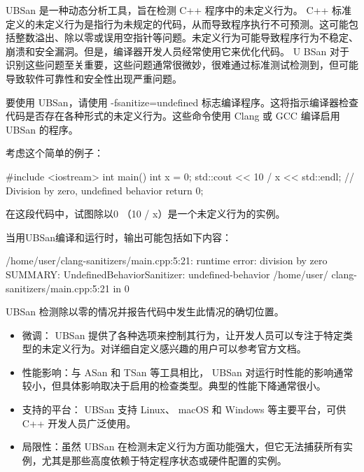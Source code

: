
UBSan 是一种动态分析工具，旨在检测 C++ 程序中的未定义行为。 C++ 标准定义的未定义行为是指行为未规定的代码，从而导致程序执行不可预测。这可能包括整数溢出、除以零或误用空指针等问题。未定义行为可能导致程序行为不稳定、崩溃和安全漏洞。但是，编译器开发人员经常使用它来优化代码。 U BSan 对于识别这些问题至关重要，这些问题通常很微妙，很难通过标准测试检测到，但可能导致软件可靠性和安全性出现严重问题。


要使用 UBSan，请使用 -fsanitize=undefined 标志编译程序。这将指示编译器检查代码是否存在各种形式的未定义行为。这些命令使用 Clang 或 GCC 编译启用 UBSan 的程序。


考虑这个简单的例子：

\begin{cpp}
#include <iostream>
int main() {
    int x = 0;
    std::cout << 10 / x << std::endl; // Division by zero, undefined behavior
    return 0;
}
\end{cpp}

在这段代码中，试图除以0 （10 / x）是一个未定义行为的实例。

当用UBSan编译和运行时，输出可能包括如下内容：

\begin{shell}
/home/user/clang-sanitizers/main.cpp:5:21: runtime error: division by
zero
SUMMARY: UndefinedBehaviorSanitizer: undefined-behavior /home/user/
clang-sanitizers/main.cpp:5:21 in
0
\end{shell}

UBSan 检测除以零的情况并报告代码中发生此情况的确切位置。


\begin{itemize}
\item
微调： UBSan 提供了各种选项来控制其行为，让开发人员可以专注于特定类型的未定义行为。对详细自定义感兴趣的用户可以参考官方文档。

\item
性能影响：与 ASan 和 TSan 等工具相比， UBSan 对运行时性能的影响通常较小，但具体影响取决于启用的检查类型。典型的性能下降通常很小。

\item
支持的平台： UBSan 支持 Linux、 macOS 和 Windows 等主要平台，可供 C++ 开发人员广泛使用。

\item
局限性：虽然 UBSan 在检测未定义行为方面功能强大，但它无法捕获所有实例，尤其是那些高度依赖于特定程序状态或硬件配置的实例。
\end{itemize}




